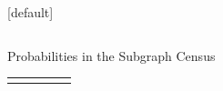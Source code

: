 \documentclass[final]{beamer}
\newlength{\onecolwid}
\newlength{\threecolwid}
\begin{document}
\begin{frame}[t]
\begin{columns}[t]
\begin{column}{\threecolwid}
\begin{columns}[t,totalwidth=\threecolwid]
\begin{column}{\onecolwid}
\begin{block}
\end{block}
[default]

\end{column} %

\end{columns} %

\begin{alertblock}{Probabilities in the Subgraph Census}

\begin{table}[b]
\def\arraystretch{1.5}
\setlength\tabcolsep{12mm}
\begin{center}
\begin{tabular}{c|c:c:c:c}
&&&&\\

\end{tabular}
\end{center}
\end{table}
\end{alertblock}
\end{column}
\end{columns}
\end{frame}
\end{document}
